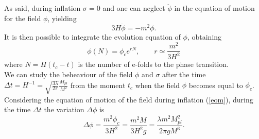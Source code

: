 \documentclass[11pt,a4paper,twoside]{book}
\begin{document}
As said, during inflation $\sigma=0$ and one can neglect $\ddot{\phi}$ in the equation of motion for the field $\phi$, yielding
\begin{equation}
	\label{eom}
	3H\dot{\phi}=-m^{2}\phi.
\end{equation}
It is then possible to integrate the evolution equation of $\phi$, obtaining
\begin{equation}	
	\label{Chap2:solutionField}
	\phi(N)=\phi_{c}e^{rN}, \qquad r\simeq \frac{m^{2}}{3H^{2}}
\end{equation}
where $ N=H(t_{c}-t) $ is the number of e-folds to the phase transition.\\
We can study the beheaviour of the field $\phi$ and $\sigma$ after the time 
$ \Delta t = H^{-1}=\sqrt{\frac{3\lambda}{2\pi}}\frac{M_{pl}}{M^{2}} $ from the moment $ t_{c} $ when the field $\phi$ becomes equal to $\phi_{c}$.
Considering the equation of motion of the field during inflation (\ref{eom}), during the time $\Delta t$ the variation $\Delta \phi$ is
\begin{equation}
	\label{Chap2:variationDeltaPhi}
	\Delta \phi = \frac{m^{2} \phi_{c}}{3H^{2}} = \frac{m^{2}M}{3H^{2}g} = \frac{\lambda m^{2}M_{pl}^{2}}{2\pi gM^{3}}.
\end{equation}
\end{document}
